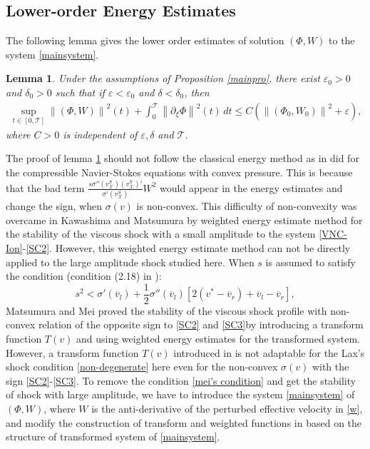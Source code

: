 \documentclass[12pt,reqno]{amsart}
\numberwithin{equation}{section}
\newcommand{\norm}[1]{\left\lVert #1 \right\rVert}
\def\p{\partial}
\def\T{\mathcal{T}}
\def\vsx{v^S_{\mathcal{X}}}
\def\avl{\overline{v}_l}
\def\avr{\overline{v}_r}
\newtheorem{lemma}[theorem]{Lemma}
\begin{document}
\subsection{Lower-order Energy Estimates}\label{3.1sec}
The following lemma gives the lower order estimates of solution $(\Phi, W)$ to the system \eqref{mainsystem}. 
\begin{lemma}\label{lowterm1}
	Under the assumptions of Proposition \ref{mainpro}, there exist $\varepsilon_0>0$ and $\delta_0>0$ such that if $\varepsilon<\varepsilon_0$ and $\delta<\delta_0$, then
	\begin{equation}\label{estimate1}
		\begin{aligned}
			\mathop{sup}\limits_{t \in [0,\T]}\norm{(\Phi,W)}^2(t)+\int_{0}^{\T} \norm{\p_{\xi}\Phi}^2(t) \,dt \leq C(\norm{(\Phi_0,W_0)}^2+\varepsilon),
		\end{aligned}
	\end{equation}
	where $C>0$ is independent of $\varepsilon,\delta$ and $\T$.
\end{lemma}
The proof of lemma \ref{lowterm1} should not follow the classical energy method as in \cite{HuangYuanCMP} did for the compressible Navier-Stokes equations
with convex pressure. This is because that the bad term $\frac{s\sigma''(\vsx)(\vsx)'}{\sigma'(\vsx)}W^2$ would appear in the energy estimates and change the sign, when $\sigma(v)$ is non-convex. This difficulty of non-convexity was overcame in Kawashima and Matsumura \cite{InitialModel} by weighted energy estimate method for the stability of the viscous shock with a small amplitude to the system \eqref{VNC-Ion}-\eqref{SC2}. However, this weighted energy estimate method can not be directly applied to the large amplitude shock studied here. 
When $s$ is assumed to satisfy the condition (condition (2.18) in \cite{Gaijin}):
\begin{equation}\label{mei's condition}
	s^2<\sigma'(\avl)+\frac{1}{2}\sigma''(\avl)[2(v^*-\avr)+\avl-\avr],
\end{equation}
Matsumura and Mei \cite{Gaijin} proved the stability of the viscous shock profile with non-convex relation of the opposite sign to \eqref{SC2} and \eqref{SC3}by introducing a transform function $T(v)$ and using weighted energy estimates for the transformed system. However, a transform function $T(v)$ introduced in  \cite{Gaijin} is not adaptable for the Lax's shock condition \eqref{non-degenerate} here even for the non-convex $\sigma(v)$ with the sign \eqref{SC2}-\eqref{SC3}. To remove the condition \eqref{mei's condition} and get the stability of shock with large amplitude, we have to introduce the system \eqref{mainsystem} of $(\Phi, W)$, where $W$ is the anti-derivative of the perturbed effective velocity in \eqref{w}, and modify the construction of transform and weighted functions in \cite{Gaijin} based on the structure of transformed system of \eqref{mainsystem}.
\end{document}
